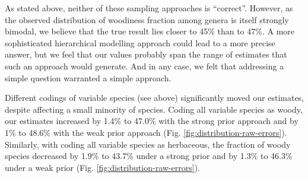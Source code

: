 \documentclass[a4paper,12pt]{article}
\begin{document}
As stated above, neither of these sampling approaches is ``correct''. However,
as the observed distribution of woodiness fraction among genera is
itself strongly bimodal, we believe that the true result lies closer
to 45\% than to 47\%.  A more sophisticated hierarchical modelling
approach could lead to a more precise answer, but we feel that our
values probably span the range of estimates that such an approach
would generate. And in any case, we felt that addressing a simple question
warranted a %
simple approach.  

Different codings of variable species (see above) significantly moved
our estimates, despite affecting a small minority of species.  Coding
all variable species as woody, our estimates
increased by 1.4\% to 47.0\% with the strong prior approach
and by 1\% to 48.6\% with the weak prior approach (Fig.
\ref{fig:distribution-raw-errors}). Similarly, with coding
all variable species as herbaceous, the fraction of woody species
decreased by 1.9\% to 43.7\% under a strong prior
and by 1.3\% to 46.3\% under a weak prior (Fig.
\ref{fig:distribution-raw-errors}).
\end{document}
